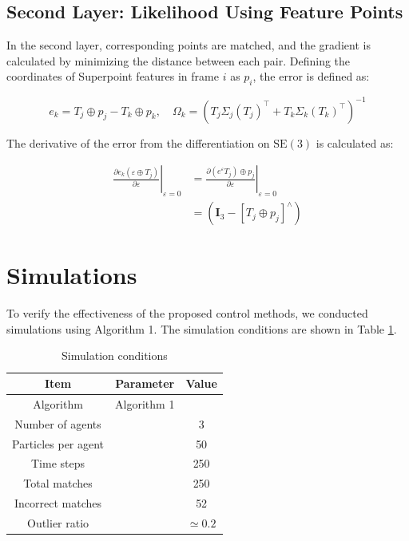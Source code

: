 \documentclass[a4paper,fleqn,10pt,twocolumn]{SICE_ISCS}
\begin{document}
\subsection{Second Layer: Likelihood Using Feature Points}
In the second layer, corresponding points are matched, and the gradient is calculated by minimizing the distance between each pair. Defining the coordinates of Superpoint features in frame $i$ as $p_{i}$, the error is defined as:

\begin{equation}
e_{k}=T_{j} \oplus p_{j}-T_{k} \oplus p_{k}, \quad \Omega_{k}=\left(T_{j} \Sigma_{j}\left(T_{j}\right)^{\top}+T_{k} \Sigma_{k}\left(T_{k}\right)^{\top}\right)^{-1}
\end{equation}

The derivative of the error from the differentiation on $\mathrm{SE}(3)$ is calculated as:

\begin{equation}
\begin{aligned}
\left.\frac{\partial e_{k}\left(\varepsilon \oplus T_{j}\right)}{\partial \varepsilon}\right|_{\varepsilon=0} & =\left.\frac{\partial\left(e^{\varepsilon} T_{j}\right) \oplus p_{j}}{\partial \varepsilon}\right|_{\varepsilon=0} \\
& =\left(\mathbf{I}_{3}-\left[T_{j} \oplus p_{j}\right]^{\wedge}\right)
\end{aligned}
\end{equation}

\section{Simulations}
To verify the effectiveness of the proposed control methods, we conducted simulations using Algorithm 1. The simulation conditions are shown in Table \ref{tab:simulation_conditions}.

\begin{table}[b]
	\begin{center}
		\caption{Simulation conditions}
		\label{tab:simulation_conditions}
		\begin{tabular}{c c c} \hline
			Item & Parameter & Value \\ \hline
			Algorithm & Algorithm 1 & \\
			Number of agents & & 3 \\
			Particles per agent & & 50 \\
			Time steps & & 250 \\
			Total matches & & 250 \\
			Incorrect matches & & 52 \\
			Outlier ratio & & $\simeq 0.2$ \\ \hline
		\end{tabular}
	\end{center}
	\vspace{-1mm}
\end{table}
\end{document}
